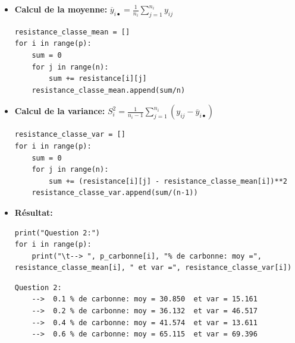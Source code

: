 \begin{itemize}
    \item \textbf{Calcul de la moyenne:}  $\overline{y}_{i\bullet}=\frac{1}{n_{i}} \sum^{n_{i}}_{j=1} y_{ij}$ \\
    \begin{lstlisting}[style=myPython, caption=Calcul de la moyenne, frame=lines]
resistance_classe_mean = []
for i in range(p):
    sum = 0
    for j in range(n):
        sum += resistance[i][j]
    resistance_classe_mean.append(sum/n)
\end{lstlisting}

    \item \textbf{Calcul de la variance:}  $S_{i}^{2}=\frac{1}{n_{i}-1} \sum^{n_{i}}_{j=1} (y_{ij}-\overline{y}_{i\bullet})$ \\
    \begin{lstlisting}[style=myPython, caption=Calcul de la variance, frame=lines]
resistance_classe_var = []
for i in range(p):
    sum = 0
    for j in range(n):
        sum += (resistance[i][j] - resistance_classe_mean[i])**2
    resistance_classe_var.append(sum/(n-1))
\end{lstlisting}

    \item \textbf{Résultat:} \\
    
    \begin{lstlisting}[style=myPython, caption=Affichage du résultat, frame=lines]
print("Question 2:")
for i in range(p):
    print("\t--> ", p_carbonne[i], "% de carbonne: moy =", resistance_classe_mean[i], " et var =", resistance_classe_var[i])
\end{lstlisting}

    \begin{lstlisting}[style=myLog, caption=Résultat, frame=lines]
Question 2:
    -->  0.1 % de carbonne: moy = 30.850  et var = 15.161
    -->  0.2 % de carbonne: moy = 36.132  et var = 46.517
    -->  0.4 % de carbonne: moy = 41.574  et var = 13.611
    -->  0.6 % de carbonne: moy = 65.115  et var = 69.396
\end{lstlisting}
    


\end{itemize}
